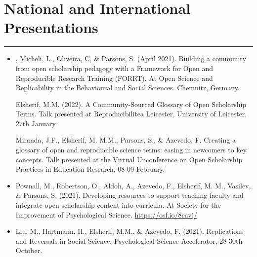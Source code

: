 \documentclass[letterpaper]{article}
\begin{document}
\section*{\color{Brown} National and International Presentations}
\vspace{-.5em}
\hrule
\vspace{1em}
\begin{itemize}

\item[] {, Micheli, L., Oliveira, C, \& Parsons, S. (April 2021). Building a community from open scholarship pedagogy with a Framework for Open and Reproducible Research Training (FORRT). At Open Science and Replicability in the Behavioural and Social Sciences. Chemnitz, Germany.}

Elsherif, M.M. (2022). A Community-Sourced Glossary of Open Scholarship Terms. Talk presented at Reproducibilitea Leicester, University of Leicester, 27th January.

Miranda, J.F., Elsherif, M. M.M., Parsons, S., \& Azevedo, F. Creating a glossary of open and reproducible science terms: easing in newcomers to key concepts. Talk presented at the Virtual Unconference on Open Scholarship Practices in Education Research, 08-09 February.

\item[] {\noindent Pownall, M., Robertson, O., Aldoh, A., Azevedo, F., Elsherif, M. M.,  Vasilev, \& Parsons, S. (2021). Developing resources to support teaching faculty and integrate open scholarship content into curricula. At Society for the Improvement of Psychological Science.} \href{https://osf.io/8eavj/}{\color{BlueViolet}https://osf.io/8eavj/}

\item[] {\noindent Liu, M., Hartmann, H., Elsherif, M.M.,  \& Azevedo, F. (2021). Replications and Reversals in Social Science.  Psychological Science Accelerator, 28-30th October.}

\end{itemize}
\end{document}
